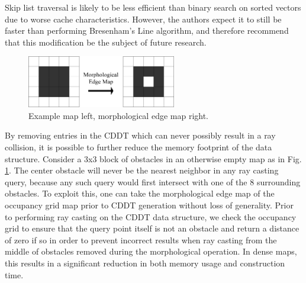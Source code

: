 \documentclass[letterpaper, 10 pt, conference]{ieeeconf}  %
\newcommand{\img}[1]{\begin{center}\texttt{[image: \{\#1]}}\end{center}}
\begin{document}
Skip list traversal is likely to be less efficient than binary search on sorted vectors due to worse cache characteristics. However, the authors expect it to still be faster than performing Bresenham’s Line algorithm, and therefore recommend that this modification be the subject of future research.

\begin{figure}[h]
\begin{center}\includegraphics[width=6.5cm]{edge_map.png}\end{center}
\caption{Example map left, morphological edge map right.}
\label{edge_map}
\end{figure}

By removing entries in the CDDT which can never possibly result in a ray collision, it is possible to further reduce the memory footprint of the data structure. Consider a 3x3 block of obstacles in an otherwise empty map as in Fig. \ref{edge_map}. The center obstacle will never be the nearest neighbor in any ray casting query, because any such query would first intersect with one of the 8 surrounding obstacles. To exploit this, one can take the morphological edge map of the occupancy grid map prior to CDDT generation without loss of generality. Prior to performing ray casting on the CDDT data structure, we check the occupancy grid to ensure that the query point itself is not an obstacle and return a distance of zero if so in order to prevent incorrect results when ray casting from the middle of obstacles removed during the morphological operation. In dense maps, this results in a significant reduction in both memory usage and construction time.

\end{document}
